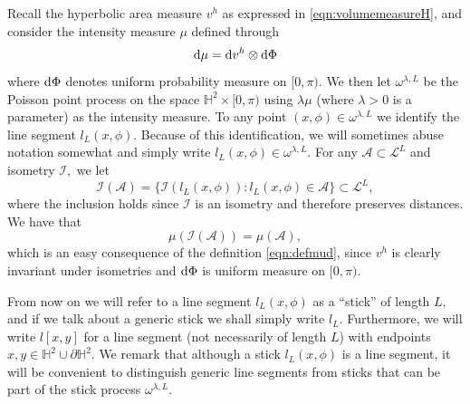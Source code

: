 \documentclass[a4paper,12pt]{article}
\newcommand{\BH}{{\mathbb{H}}}
\newcommand{\CA}{{\mathcal{A}}}
\newcommand{\CI}{{\mathcal{I}}}
\newcommand{\CL}{{\mathcal{L}}}
\newcommand{\dd}{{\rm d}}
\begin{document}
Recall the hyperbolic area measure $v^h$ as expressed in \eqref{eqn:volumemeasureH}, and consider the intensity measure $\mu$ defined through 
\begin{equation} \label{eqn:defmud}
    \dd \mu=\dd v^h \otimes \dd\Phi 
\end{equation}
where $\dd \Phi$ denotes uniform probability measure on $[0,\pi).$
We then let $\omega^{\lambda,L}$ be the Poisson point process on the space 
$\BH^2 \times [0,\pi)$ using $\lambda \mu$ 
(where $\lambda>0$ is a parameter) as the intensity 
measure. To any point $(x,\phi)\in \omega^{\lambda,L}$ we identify the line 
segment $l_L(x,\phi).$
Because of this identification, we will sometimes abuse notation somewhat and simply write
$l_L(x,\phi) \in \omega^{\lambda,L}.$ 
For any $\CA \subset \CL^L$ and isometry $\CI,$ we let 
\[
\CI(\CA)=\{\CI(l_L(x,\phi)): l_L(x,\phi)\in \CA\} \subset \CL^L,
\]
where the inclusion holds since $\CI$ is an isometry and therefore preserves distances. 
We have that 
\[
\mu(\CI(\CA))=\mu(\CA),    
\]
which is an easy consequence of the definition \eqref{eqn:defmud}, since $v^h$ is clearly 
invariant under isometries and $\dd \Phi$ is uniform measure on $[0,\pi).$




From now on we will refer to a line segment $l_L(x,\phi)$ as a ``stick'' of length $L,$
and if we talk about a generic stick we shall simply write $l_L.$  Furthermore, 
we will write $l[x,y]$ for a line segment (not necessarily of length $L$) 
with endpoints $x,y\in \BH^2 \cup \partial \BH^2.$ We remark that although a stick 
$l_L(x,\phi)$ is a line segment, it will be convenient to distinguish generic line segments
from sticks that can be part of the stick process $\omega^{\lambda,L}$.
\end{document}
